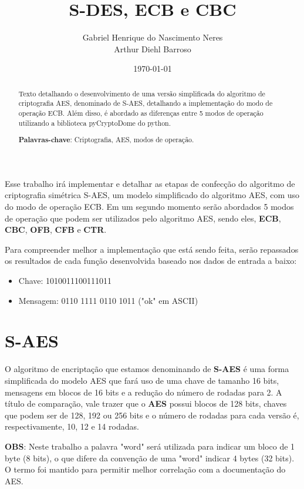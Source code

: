 \documentclass[12pt]{article}
\title{S-DES, ECB e CBC}
\author{Gabriel Henrique do Nascimento Neres \\ Arthur Diehl Barroso}
\date{\today}
\begin{document}
\maketitle

\begin{abstract}
  Texto detalhando o desenvolvimento de uma versão simplificada do algoritmo de criptografia AES, denominado de S-AES, detalhando a implementação do modo de operação ECB. Além disso, é abordado as diferenças entre 5 modos de operação utilizando a biblioteca pyCryptoDome do python.

  \textbf{Palavras-chave}: Criptografia, AES, modos de operação.
\end{abstract}

Esse trabalho irá implementar e detalhar as etapas de confecção do algoritmo de criptografia simétrica S-AES, um modelo simplificado do algoritmo AES, com uso do modo de operação ECB. Em um segundo momento serão abordados 5 modos de operação que podem ser utilizados pelo algoritmo AES, sendo eles, \textbf{ECB}, \textbf{CBC}, \textbf{OFB}, \textbf{CFB} e \textbf{CTR}.

Para compreender melhor a implementação que está sendo feita, serão repassados os resultados de cada função desenvolvida baseado nos dados de entrada a baixo:

\begin{itemize}
  \item Chave: 1010011100111011
  \item Mensagem: 0110 1111 0110 1011 ("ok" em ASCII)
\end{itemize}

\section{S-AES}
O algoritmo de encriptação que estamos denominando de \textbf{S-AES} é uma forma simplificada do modelo AES que fará uso de uma chave de tamanho 16 bits, mensagens em blocos de 16 bits e a redução do número de rodadas para 2. A título de comparação, vale trazer que o \textbf{AES} possui blocos de 128 bits, chaves que podem ser de 128, 192 ou 256 bits e o número de rodadas para cada versão é, respectivamente, 10, 12 e 14 rodadas.

\textbf{OBS}: Neste trabalho a palavra "word" será utilizada para indicar um bloco de 1 byte (8 bits), o que difere da convenção de uma "word" indicar 4 bytes (32 bits). O termo foi mantido para permitir melhor correlação com a documentação do AES.
\end{document}
